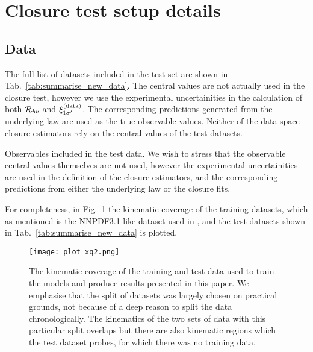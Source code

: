 \section{Closure test setup details}
\label{sec:appendix-datasets}

\subsection{Data}

The full list of datasets included in the test set are shown in
Tab.~\ref{tab:summarise_new_data}. The central values are not actually used
in the closure test, however we use the experimental uncertainities in
the calculation of both $\mathcal{R}_{bv}$ and $\xi^{(\rm data)}_{1 {{\sigma}^{\prime}}}$. The corresponding
predictions generated from the underlying law are used as the true
observable values. Neither of the data-space closure estimators rely on
the central values of the test datasets.

\begin{table}[h!]
    \begin{center}
        
    \end{center}
    \caption{
        Observables included in the test data. We wish to stress that the observable
        central values themselves are not used, however the experimental
        uncertainities are used in the definition of the closure estimators, and
        the corresponding predictions from either the underlying law or the
        closure fits.
    }
    \label{tab:summarise_new_data}
\end{table}

For completeness, in Fig.~\ref{fig:DataKinematicCoverage}
the kinematic coverage of the training datasets, which
as mentioned is the NNPDF3.1-like dataset used in \cite{Faura_2020}, and the
test datasets shown in Tab.~\ref{tab:summarise_new_data} is plotted.

\begin{figure}
    \centering
    \texttt{[image: plot\_xq2.png]}
    \caption{The kinematic coverage of the training and test data
    used to train the models and produce results presented in this paper. We emphasise
    that the split of datasets was largely chosen on practical grounds, not because
    of a deep reason to split the data chronologically. The kinematics of the two
    sets of data with this particular split overlaps but there are also kinematic
    regions which the test dataset probes, for which there was no training data.}
    \label{fig:DataKinematicCoverage}
\end{figure}


